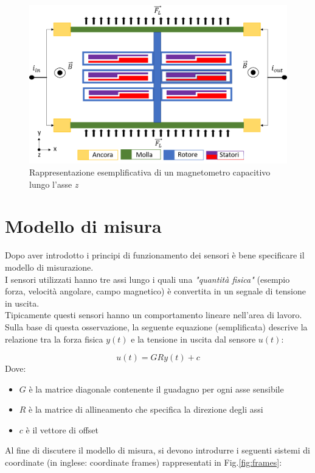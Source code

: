  \begin{figure}[H]  
	\centering 
	\includegraphics[scale=0.4 ]{tecnologie/magnet.png}
	\caption{Rappresentazione esemplificativa di un magnetometro capacitivo lungo l'asse \textit{z}}
	\label{fig:magnet}
\end{figure}


\section{Modello di misura}
Dopo aver introdotto i principi di funzionamento dei sensori è bene specificare il modello di misurazione.\\
I sensori utilizzati hanno tre assi lungo i quali una \textit{"quantità fisica"} (esempio forza, velocità angolare, campo magnetico) è convertita in un segnale di tensione in uscita. \\
Tipicamente questi sensori hanno un comportamento lineare nell'area di lavoro. Sulla base di questa osservazione, la seguente equazione (semplificata) descrive la relazione tra la forza fisica $y(t)$ e la tensione in uscita dal sensore $ u(t)$:

\begin{equation}
    u(t) = G R y(t) + c
\end{equation}
Dove:
\begin{itemize}
	\item $G$ è la matrice diagonale contenente il guadagno per ogni asse sensibile
	\item $R$ è la matrice di allineamento che specifica la direzione degli assi
	\item $c$ è il vettore di offset 
\end{itemize}
Al fine di discutere il modello di misura, si devono introdurre i seguenti sistemi di coordinate (in inglese: coordinate frames) rappresentati in Fig.\ref{fig:frames}:

